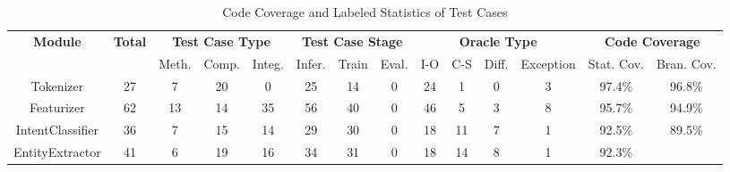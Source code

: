   \begin{table*}[ht]
        \begin{center}
        \caption{Code Coverage and Labeled Statistics of Test Cases}
        \vspace{-5pt}
        \begin{tabular}{cccccccccccccc}
          \hline
          \multirow{2}{*}{\textbf{Module}} &
            \multirow{2}{*}{\textbf{Total}} &
            \multicolumn{3}{c}{\textbf{Test Case Type}} &
            \multicolumn{3}{c}{\textbf{Test Case Stage}} &
            \multicolumn{4}{c}{\textbf{Oracle Type}} &
            \multicolumn{2}{c}{\textbf{Code Coverage}} \\ \cline{3-14} 
           &
             &
            Meth. &
            Comp. &
            Integ. &
            Infer. &
            Train &
            Eval. &
            I-O &
            C-S &
            Diff. &
            Exception &
            Stat. Cov. &
            Bran. Cov. \\ \hline
          \multicolumn{1}{c|}{Tokenizer} &
            \multicolumn{1}{c|}{27} &
            7 &
            20 &
            \multicolumn{1}{c|}{0} &
            25 &
            14 &
            \multicolumn{1}{c|}{0} &
            24 &
            1 &
            0 &
            \multicolumn{1}{c|}{3} &
            97.4\% &
            96.8\% \\
          \multicolumn{1}{c|}{Featurizer} &
            \multicolumn{1}{c|}{62} &
            13 &
            14 &
            \multicolumn{1}{c|}{35} &
            56 &
            40 &
            \multicolumn{1}{c|}{0} &
            46 &
            5 &
            3 &
            \multicolumn{1}{c|}{8} &
            95.7\% &
            94.9\% \\
          \multicolumn{1}{c|}{IntentClassifier} &
            \multicolumn{1}{c|}{36} &
            7 &
            15 &
            \multicolumn{1}{c|}{14} &
            29 &
            30 &
            \multicolumn{1}{c|}{0} &
            18 &
            11 &
            7 &
            \multicolumn{1}{c|}{1} &
            92.5\% &
            89.5\% \\
          \multicolumn{1}{c|}{EntityExtractor} &
            \multicolumn{1}{c|}{41} &
            6 &
            19 &
            \multicolumn{1}{c|}{16} &
            34 &
            31 &
            \multicolumn{1}{c|}{0} &
            18 &
            14 &
            8 &
            \multicolumn{1}{c|}{1} &
            92.3\% &

\end{tabular}
\end{center}
\end{table*}
